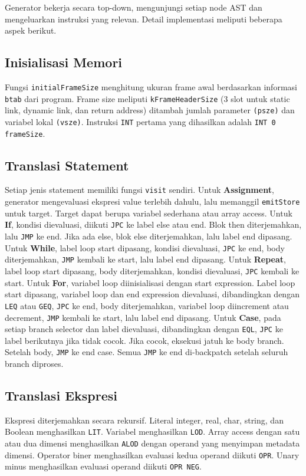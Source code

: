 Generator bekerja secara top-down, mengunjungi setiap node AST dan mengeluarkan instruksi yang relevan. Detail implementasi meliputi beberapa aspek berikut.

\subsection{Inisialisasi Memori}
Fungsi \texttt{initialFrameSize} menghitung ukuran frame awal berdasarkan informasi \texttt{btab} dari program. Frame size meliputi \texttt{kFrameHeaderSize} (3 slot untuk static link, dynamic link, dan return address) ditambah jumlah parameter \texttt{(psze)} dan variabel lokal \texttt{(vsze)}. Instruksi \texttt{INT} pertama yang dihasilkan adalah \texttt{INT 0 frameSize}.

\subsection{Translasi Statement}
Setiap jenis statement memiliki fungsi \texttt{visit} sendiri. Untuk \textbf{Assignment}, generator mengevaluasi ekspresi value terlebih dahulu, lalu memanggil \texttt{emitStore} untuk target. Target dapat berupa variabel sederhana atau array access. Untuk \textbf{If}, kondisi dievaluasi, diikuti \texttt{JPC} ke label else atau end. Blok then diterjemahkan, lalu \texttt{JMP} ke end. Jika ada else, blok else diterjemahkan, lalu label end dipasang. Untuk \textbf{While}, label loop start dipasang, kondisi dievaluasi, \texttt{JPC} ke end, body diterjemahkan, \texttt{JMP} kembali ke start, lalu label end dipasang. Untuk \textbf{Repeat}, label loop start dipasang, body diterjemahkan, kondisi dievaluasi, \texttt{JPC} kembali ke start. Untuk \textbf{For}, variabel loop diinisialisasi dengan start expression. Label loop start dipasang, variabel loop dan end expression dievaluasi, dibandingkan dengan \texttt{LEQ} atau \texttt{GEQ}, \texttt{JPC} ke end, body diterjemahkan, variabel loop diincrement atau decrement, \texttt{JMP} kembali ke start, lalu label end dipasang. Untuk \textbf{Case}, pada setiap branch selector dan label dievaluasi, dibandingkan dengan \texttt{EQL}, \texttt{JPC} ke label berikutnya jika tidak cocok. Jika cocok, eksekusi jatuh ke body branch. Setelah body, \texttt{JMP} ke end case. Semua \texttt{JMP} ke end di-backpatch setelah seluruh branch diproses.

\subsection{Translasi Ekspresi}
Ekspresi diterjemahkan secara rekursif. Literal integer, real, char, string, dan Boolean menghasilkan \texttt{LIT}. Variabel menghasilkan \texttt{LOD}. Array access dengan satu atau dua dimensi menghasilkan \texttt{ALOD} dengan operand yang menyimpan metadata dimensi. Operator biner menghasilkan evaluasi kedua operand diikuti \texttt{OPR}. Unary minus menghasilkan evaluasi operand diikuti \texttt{OPR NEG}.

